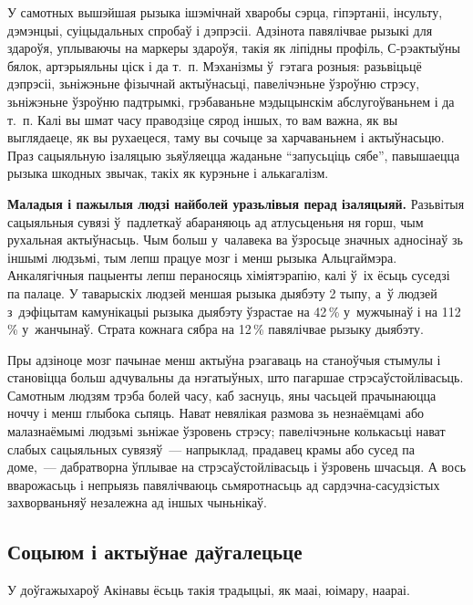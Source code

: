 У самотных вышэйшая рызыка ішэмічнай хваробы сэрца, гіпэртаніі, інсульту, дэмэнцыі, суіцыдальных спробаў і дэпрэсіі. Адзінота павялічвае рызыкі для здароўя, уплываючы на маркеры здароўя, такія як ліпідны профіль, С-рэактыўны бялок, артэрыяльны ціск і да т.~п. Мэханізмы ў~гэтага розныя: разьвіцьцё дэпрэсіі, зьніжэньне фізычнай актыўнасьці, павелічэньне ўзроўню стрэсу, зьніжэньне ўзроўню падтрымкі, грэбаваньне мэдыцынскім абслугоўваньнем і да т.~п. Калі вы шмат часу праводзіце сярод іншых, то вам важна, як вы выглядаеце, як вы рухаецеся, таму вы сочыце за харчаваньнем і актыўнасьцю. Праз сацыяльную ізаляцыю зьяўляецца жаданьне ``запусьціць сябе'', павышаецца рызыка шкодных звычак, такіх як курэньне і алькагалізм.

\textbf{Маладыя і пажылыя людзі найболей уразьлівыя перад ізаляцыяй.} Разьвітыя сацыяльныя сувязі ў~падлеткаў абараняюць ад атлусьценьня ня горш, чым рухальная актыўнасьць. Чым больш у~чалавека ва ўзросьце значных адносінаў зь іншымі людзьмі, тым лепш працуе мозг і менш рызыка Альцгаймэра. Анкалягічныя пацыенты лепш пераносяць хіміятэрапію, калі ў~іх ёсьць суседзі па палаце. У таварыскіх людзей меншая рызыка дыябэту 2 тыпу, а~ў людзей з~дэфіцытам камунікацыі рызыка дыябэту ўзрастае на 42\,\% у~мужчынаў і на 112\,\% у~жанчынаў. Страта кожнага сябра на 12\,\% павялічвае рызыку дыябэту.


Пры адзіноце мозг пачынае менш актыўна рэагаваць на станоўчыя стымулы і становіцца больш адчувальны да нэгатыўных, што пагаршае стрэсаўстойлівасьць. Самотным людзям трэба болей часу, каб заснуць, яны часьцей прачынаюцца ноччу і менш глыбока сьпяць. Нават невялікая размова зь незнаёмцамі або малазнаёмымі людзьмі зьніжае ўзровень стрэсу; павелічэньне колькасьці нават слабых сацыяльных сувязяў~--- напрыклад, прадавец крамы або сусед па доме,~--- дабратворна ўплывае на стрэсаўстойлівасьць і ўзровень шчасьця. А вось вварожасьць і непрыязь павялічваюць сьмяротнасьць ад сардэчна-сасудзістых захворваньняў незалежна ад іншых чыньнікаў. 

\subsection*{Соцыюм і актыўнае даўгалецьце}

У доўгажыхароў Акінавы ёсьць такія традыцыі, як мааі, юімару, наараі.

